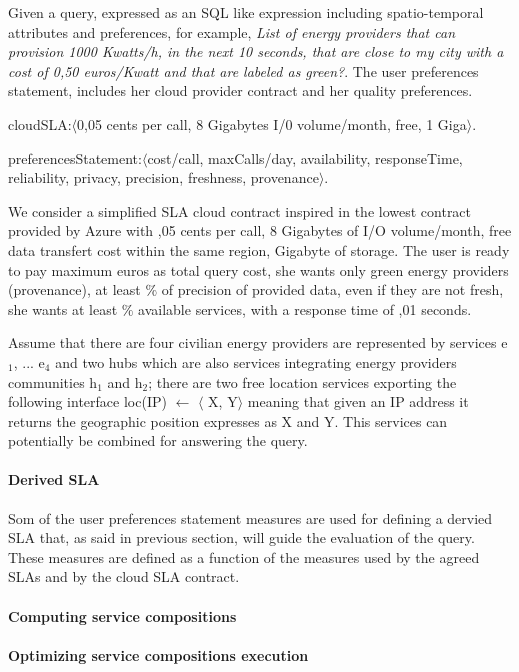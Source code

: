  Given a query, expressed as an SQL like expression including spatio-temporal attributes and preferences, for example, {\em List of energy providers that can provision 1000 Kwatts/h, in the next 10 seconds, that are close to my city with a cost of 0,50 euros/Kwatt and that are labeled as green?}. The user preferences statement, includes her cloud provider contract and her quality preferences. 
 \begin{description}
\sf\footnotesize
 
 \item  {\sf cloudSLA:$\langle$0,05 cents per call, 8 Gigabytes I/0 volume/month, free, 1 Giga$\rangle$}. 
 
 \item {\sf preferencesStatement:$\langle$cost/call, maxCalls/day, availability, responseTime, reliability, privacy, precision, freshness, provenance$\rangle$}. 
 
 \end{description}
 We consider a simplified SLA cloud contract inspired in the lowest contract provided by Azure with {,05 cents per call,  8 Gigabytes of I/O volume/month, free data transfert cost within the same region,  Gigabyte of storage}. The user is ready to pay maximum { euros as total query cost}, she wants only {\sf green} energy providers (provenance), at least {$\%$} of precision of provided data, even if they are not fresh, she wants at least {$\%$} available services, with a response time of {,01 seconds}.
 
 Assume that there are four civilian energy providers are represented by services  {\sf e$_1$, ... e$_4$} and two {\sf hub}s which are also services integrating energy providers communities {\sf h$_1$ and h$_2$}; there are two free location services exporting  the following interface {\sf loc(IP) $\leftarrow$ $\langle$ X, Y$\rangle$} meaning that given an IP address it returns the geographic position expresses as {\sf X} and {\sf Y}. This services can potentially be combined for answering the query. 
 
 \paragraph{Derived SLA} Som of the user preferences statement measures are used for defining a dervied SLA that, as said in previous section, will guide the evaluation of the query. These measures are defined as a function of the measures used by the agreed SLAs and by the cloud SLA contract.
 
  \paragraph{Computing service compositions}
  
   \paragraph{Optimizing service compositions execution}
 